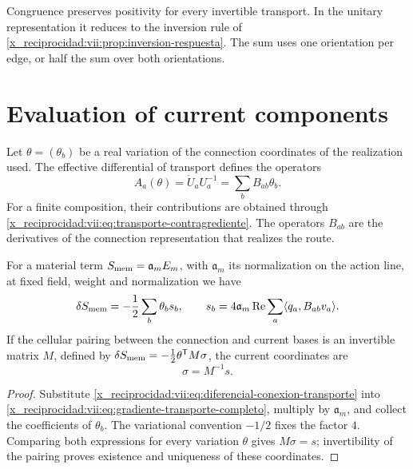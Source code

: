Congruence preserves positivity for every invertible transport.
In the unitary representation it reduces to the inversion rule of
\ref{x_reciprocidad:vii:prop:inversion-respuesta}. The sum uses one orientation
per edge, or half the sum over both orientations.

\section{Evaluation of current components}

Let \(\theta=(\theta_b)\) be a real variation of the connection
coordinates of the realization used. The effective differential of
transport defines the operators
\begin{equation}
 A_a(\theta)=\dot U_aU_a^{-1}
     =\sum_bB_{ab}\theta_b.
 \label{x_reciprocidad:vii:eq:diferencial-conexion-transporte}
\end{equation}
For a finite composition, their contributions are obtained through
\eqref{x_reciprocidad:vii:eq:transporte-contragrediente}. The operators
\(B_{ab}\) are the derivatives of the connection representation that
realizes the route.

\begin{theorem}
\label{x_reciprocidad:vii:thm:corriente-conexion-evaluada}
For a material term \(S_{\rm mem}=\mathfrak a_m E_m\),
with \(\mathfrak a_m\) its normalization on the action line,
at fixed field, weight and normalization we have
\begin{equation}
 \delta S_{\rm mem}=-\frac12\sum_b\theta_b s_b,\qquad
 s_b=4\mathfrak a_m\operatorname{Re}
        \sum_a\langle q_a,B_{ab}v_a\rangle.
 \label{x_reciprocidad:vii:eq:componentes-corriente-conexion}
\end{equation}
If the cellular pairing between the connection and current bases
is an invertible matrix \(M\), defined by
\(\delta S_{\rm mem}=-\tfrac12\theta^{\mathsf T}M\sigma\),
the current coordinates are
\begin{equation}
 \sigma=M^{-1}s.
 \label{x_reciprocidad:vii:eq:coordenadas-corriente-material}
\end{equation}
\end{theorem}

\begin{proof}
Substitute \eqref{x_reciprocidad:vii:eq:diferencial-conexion-transporte} into
\eqref{x_reciprocidad:vii:eq:gradiente-transporte-completo}, multiply by
\(\mathfrak a_m\), and collect the coefficients of
\(\theta_b\). The variational convention \(-1/2\) fixes the
factor \(4\). Comparing both expressions for every variation
\(\theta\) gives \(M\sigma=s\); invertibility of the pairing
proves existence and uniqueness of these coordinates.
\end{proof}

